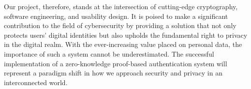 Our project, therefore, stands at the intersection of cutting-edge cryptography, software engineering, and usability design. It is poised to make a significant contribution to the field of cybersecurity by providing a solution that not only protects users' digital identities but also upholds the fundamental right to privacy in the digital realm. With the ever-increasing value placed on personal data, the importance of such a system cannot be underestimated. The successful implementation of a zero-knowledge proof-based authentication system will represent a paradigm shift in how we approach security and privacy in an interconnected world.
